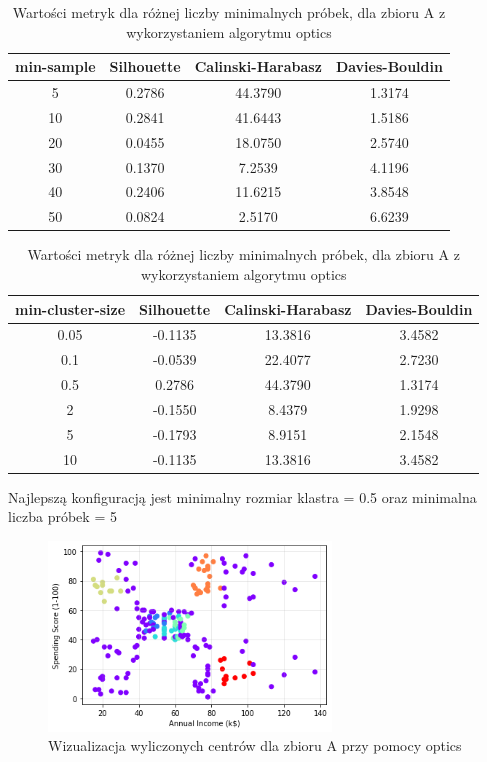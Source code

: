 \documentclass[a4paper,11pt]{article}
\begin{document}
\begin{table}[H]
    \centering
    \begin{tabular}{|c|c|c|c|}
    \hline
    \textbf{min-sample} & \textbf{Silhouette} & \textbf{Calinski-Harabasz} & \textbf{Davies-Bouldin} \\ \hline
    5   & 0.2786 & 44.3790 & 1.3174 \\ \hline
    10  & 0.2841 & 41.6443 & 1.5186 \\ \hline
    20  & 0.0455 & 18.0750 & 2.5740 \\ \hline
    30  & 0.1370 & 7.2539 & 4.1196 \\ \hline
    40 & 0.2406 & 11.6215 & 3.8548 \\ \hline
    50 & 0.0824 & 2.5170 & 6.6239 \\ \hline
    \end{tabular}
    \caption{Wartości metryk dla różnej liczby minimalnych próbek, dla zbioru A z wykorzystaniem algorytmu optics}
    \label{tab:op_a_1}
\end{table}
\begin{table}[H]
    \centering
    \begin{tabular}{|c|c|c|c|}
    \hline
    \textbf{min-cluster-size} & \textbf{Silhouette} & \textbf{Calinski-Harabasz} & \textbf{Davies-Bouldin} \\ \hline
    0.05   & -0.1135 & 13.3816 & 3.4582 \\ \hline
    0.1  & -0.0539 & 22.4077 & 2.7230 \\ \hline
    0.5  & 0.2786 & 44.3790 & 1.3174 \\ \hline
    2  & -0.1550 & 8.4379 & 1.9298 \\ \hline
    5 & -0.1793 & 8.9151 & 2.1548 \\ \hline
    10 & -0.1135 & 13.3816 & 3.4582 \\ \hline
    \end{tabular}
    \caption{Wartości metryk dla różnej liczby minimalnych próbek, dla zbioru A z wykorzystaniem algorytmu optics}
    \label{tab:op_a_2}
\end{table}
Najlepszą konfiguracją jest minimalny rozmiar klastra = 0.5 oraz minimalna liczba próbek = 5 
\begin{figure}[!htbp]
    \centering
    \includegraphics[width=0.67\textwidth]{images2/op/opA.png}
    \caption{Wizualizacja wyliczonych centrów dla zbioru A przy pomocy optics}
    \label{fig:op_i_3}
\end{figure}
\end{document}
